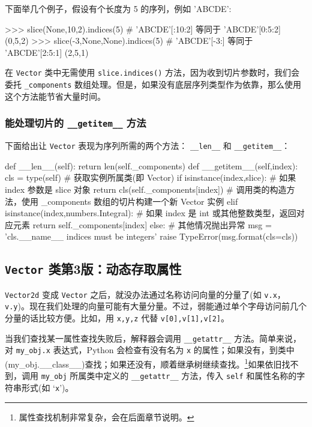 下面举几个例子，假设有个长度为 5 的序列，例如 'ABCDE':

\begin{python}
>>> slice(None,10,2).indices(5)     # 'ABCDE'[:10:2] 等同于 'ABCDE'[0:5:2]
(0,5,2)
>>> slice(-3,None,None).indices(5)  # 'ABCDE'[-3:] 等同于 'ABCDE'[2:5:1]
(2,5,1)
\end{python}

在 \texttt{Vector} 类中无需使用 \texttt{slice.indices()} 方法，因为收到切片参数时，我们会委托 \texttt{\_components} 数组处理。但是，如果没有底层序列类型作为依靠，那么使用这个方法能节省大量时间。

\subsubsection{能处理切片的 \texttt{\_\_getitem\_\_} 方法}

下面给出让 \texttt{Vector} 表现为序列所需的两个方法： \texttt{\_\_len\_\_} 和 \texttt{\_\_getitem\_\_}：

\begin{python}
def __len__(self):
    return len(self._components)
def __getitem__(self,index):
    cls = type(self)    # 获取实例所属类(即 Vector)
    if isinstance(index,slice):     # 如果 index 参数是 slice 对象
        return cls(self._components[index])     # 调用类的构造方法，使用 _components 数组的切片构建一个新 Vector 实例
    elif isinstance(index,numbers.Integral):    # 如果 index 是 int 或其他整数类型，返回对应元素
        return self._components[index]
    else:                                       # 其他情况抛出异常
        msg = '{cls.__name__} indices must be integers'
        raise TypeError(msg.format(cls=cls))
\end{python}

\subsection{\texttt{Vector} 类第3版：动态存取属性}

\texttt{Vector2d} 变成 \texttt{Vector} 之后，就没办法通过名称访问向量的分量了(如 \texttt{v.x}，\texttt{v.y})。现在我们处理的向量可能有大量分量。不过，弱能通过单个字母访问前几个分量的话比较方便。比如，用 \texttt{x,y,z} 代替 \texttt{v[0],v[1],v[2]}。

当我们查找某一属性查找失败后，解释器会调用 \texttt{\_\_getattr\_\_} 方法。简单来说，对 \texttt{my\_obj.x} 表达式，Python 会检查有没有名为 \texttt{x} 的属性；如果没有，到类中(my\_obj.\_\_class\_\_)查找；如果还没有，顺着继承树继续查找。\footnote{属性查找机制非常复杂，会在后面章节说明。}如果依旧找不到，调用 \texttt{my\_obj} 所属类中定义的 \texttt{\_\_getattr\_\_} 方法，传入 \texttt{self} 和属性名称的字符串形式(如 `\texttt{x}')。

